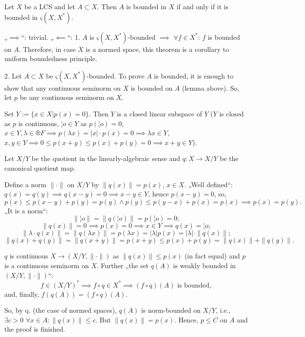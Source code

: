 \documentclass[12pt]{article}					%
\begin{document}
\begin{veta}
	Let $X$ be a LCS and let $A \subset X$. Then $A$ is bounded in $X$ if and only if it is bounded in $ς(X, X^*)$.

	\begin{dukazin}
		„$\implies$“: trivial. „$\impliedby$“: 1. $A$ is $ς(X, X^*)$-bounded $\implies$ $\forall f \in X^*$: $f$ is bounded on $A$. Therefore, in case $X$ is a normed space, this theorem is a corollary to uniform boundedness principle.

		2. Let $A \subset X$ be $ς(X, X^*)$-bounded. To prove $A$ is bounded, it is enough to show that any continuous seminorm on $X$ is bounded on $A$ (lemma above). So, let $p$ be any continuous seminorm on $X$.

		Set $Y := \{x \in X | p(x) = 0\}$. Then $Y$ is a closed linear subspace of $Y$ ($Y$ is closed as $p$ is continuous, $¦o \in Y$ as $p(¦o) = 0$, $x \in Y, λ \in ®F \implies p(λx) = |x|·p(x) = 0 \implies λ x \in Y$, $x, y \in Y \implies 0 ≤ p(x + y) ≤ p(x) + p(y) = 0 \implies x + y \in Y$).

		Let $X / Y$ be the quotient in the linearly-algebraic sense and $q: X \rightarrow X / Y$ be the canonical quotient map.

		Define a norm $\|·\|$ on $X / Y$ by $\|q(x)\| = p(x)$, $x \in X$. „Well defined“: $q(x) = q(y) \implies q(x - y) = 0 \implies x - y \in Y$, hence $p(x - y) = 0$, so,
		$$ p(x) ≤ p(x - y) + p(y) = p(y) \land p(y) ≤ p(y - x) + p(x) = p(x) \implies p(x) = p(y). $$
		„It is a norm“:
		$$ \|¦o\| = \|q(¦o)\| = p(¦o) = 0; $$
		$$ \|q(x)\| = 0 \implies p(x) = 0 \implies x \in Y \implies q(x) = ¦o; $$
		$$ \|λ·q(x)\| = \|q(λ x)\| = p(λ x) = |λ| p(x) = |λ|·\|q(x)\|; $$
		$$ \|q(x) + q(y)\| = \|q(x + y)\| = p(x + y) ≤ p(x) + p(y) = \|q(x)\| + \|q(y)\|. $$

		$q$ is continuous $X \rightarrow (X / Y, \|·\|)$ as $\|q(x)\| ≤ p(x)$ (in fact equal) and $p$ is a continuous seminorm on $X$. Further „the set $q(A)$ is weakly bounded in $(X / Y, \|·\|)$“:
		$$ f \in (X / Y)^* \implies f ∘ q \in X^* \implies (f ∘ q)(A) \text{ is bounded}, $$
		and, finally, $f(q(A)) = (f ∘ q)(A)$.

		So, by q. (the case of normed spaces), $q(A)$ is norm-bounded on $X / Y$, i.e., $\exists c > 0$ $\forall x \in A: \|q(x)\| ≤ c$. But $\|q(x)\| = p(x)$. Hence, $p ≤ C$ on $A$ and the proof is finished.
	\end{dukazin}
\end{veta}
\end{document}
